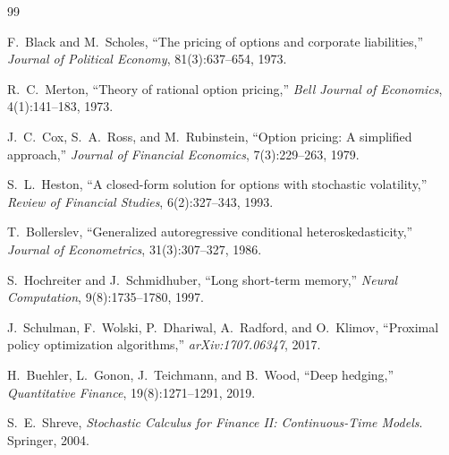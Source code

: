\documentclass[10pt,a4paper]{article}
\begin{document}
{\footnotesize
\begin{thebibliography}{99}

F.~Black and M.~Scholes,
``The pricing of options and corporate liabilities,''
\textit{Journal of Political Economy}, 81(3):637--654, 1973.

R.~C.~Merton,
``Theory of rational option pricing,''
\textit{Bell Journal of Economics}, 4(1):141--183, 1973.

J.~C.~Cox, S.~A.~Ross, and M.~Rubinstein,
``Option pricing: A simplified approach,''
\textit{Journal of Financial Economics}, 7(3):229--263, 1979.

S.~L.~Heston,
``A closed-form solution for options with stochastic volatility,''
\textit{Review of Financial Studies}, 6(2):327--343, 1993.

T.~Bollerslev,
``Generalized autoregressive conditional heteroskedasticity,''
\textit{Journal of Econometrics}, 31(3):307--327, 1986.

S.~Hochreiter and J.~Schmidhuber,
``Long short-term memory,''
\textit{Neural Computation}, 9(8):1735--1780, 1997.

J.~Schulman, F.~Wolski, P.~Dhariwal, A.~Radford, and O.~Klimov,
``Proximal policy optimization algorithms,''
\textit{arXiv:1707.06347}, 2017.

H.~Buehler, L.~Gonon, J.~Teichmann, and B.~Wood,
``Deep hedging,''
\textit{Quantitative Finance}, 19(8):1271--1291, 2019.

S.~E.~Shreve,
\textit{Stochastic Calculus for Finance II: Continuous-Time Models}.
Springer, 2004.

\end{thebibliography}
}
\end{document}
